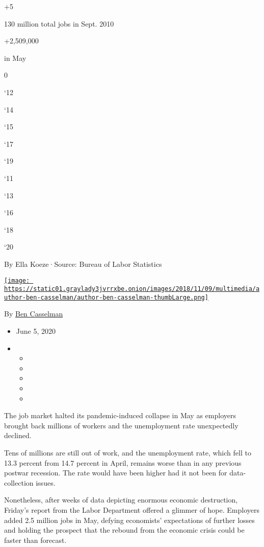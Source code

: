 +5

130 million total jobs in Sept. 2010

+2,509,000

in May

0

`12

`14

`15

`17

`19

`11

`13

`16

`18

`20

By Ella Koeze·Source: Bureau of Labor Statistics

\href{https://www.nytimes3xbfgragh.onion/by/ben-casselman}{\texttt{[image: https://static01.graylady3jvrrxbe.onion/images/2018/11/09/multimedia/author-ben-casselman/author-ben-casselman-thumbLarge.png]}}

By \href{https://www.nytimes3xbfgragh.onion/by/ben-casselman}{Ben
Casselman}

\begin{itemize}
\item
  June 5, 2020
\item
  \begin{itemize}
  \item
  \item
  \item
  \item
  \item
  \end{itemize}
\end{itemize}

The job market halted its pandemic-induced collapse in May as employers
brought back millions of workers and the unemployment rate unexpectedly
declined.

Tens of millions are still out of work, and the unemployment rate, which
fell to 13.3 percent from 14.7 percent in April, remains worse than in
any previous postwar recession. The rate would have been higher had it
not been for data-collection issues.

Nonetheless, after weeks of data depicting enormous economic
destruction, Friday's report from the Labor Department offered a glimmer
of hope. Employers added 2.5 million jobs in May, defying economists'
expectations of further losses and holding the prospect that the rebound
from the economic crisis could be faster than forecast.

